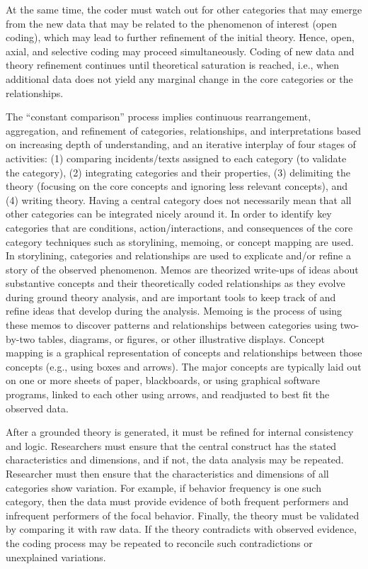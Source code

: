 At the same time, the coder must watch out for other categories that may emerge from the new data that may be related to the phenomenon of interest (open coding), which may lead to further refinement of the initial theory. Hence, open, axial, and selective coding may proceed simultaneously. Coding of new data and theory refinement continues until theoretical saturation is reached, i.e., when additional data does not yield any marginal change in the core categories or the relationships.

The ``constant comparison'' process implies continuous rearrangement, aggregation, and refinement of categories, relationships, and interpretations based on increasing depth of understanding, and an iterative interplay of four stages of activities: (1) comparing incidents/texts assigned to each category (to validate the category), (2) integrating categories and their properties, (3) delimiting the theory (focusing on the core concepts and ignoring less relevant concepts), and (4) writing theory. Having a central category does not necessarily mean that all other categories can be integrated nicely around it. In order to identify key categories that are conditions, action/interactions, and consequences of the core category techniques such as storylining, memoing, or concept mapping are used. In storylining, categories and relationships are used to explicate and/or refine a story of the observed phenomenon. Memos are theorized write-ups of ideas about substantive concepts and their theoretically coded relationships as they evolve during ground theory analysis, and are important tools to keep track of and refine ideas that develop during the analysis. Memoing is the process of using these memos to discover patterns and relationships between categories using two-by-two tables, diagrams, or figures, or other illustrative displays. Concept mapping is a graphical representation of concepts and relationships between those concepts (e.g., using boxes and arrows). The major concepts are typically laid out on one or more sheets of paper, blackboards, or using graphical software programs, linked to each other using arrows, and readjusted to best fit the observed data.

After a grounded theory is generated, it must be refined for internal consistency and logic. Researchers must ensure that the central construct has the stated characteristics and dimensions, and if not, the data analysis may be repeated. Researcher must then ensure that the characteristics and dimensions of all categories show variation. For example, if behavior frequency is one such category, then the data must provide evidence of both frequent performers and infrequent performers of the focal behavior. Finally, the theory must be validated by comparing it with raw data. If the theory contradicts with observed evidence, the coding process may be repeated to reconcile such contradictions or unexplained variations. 

